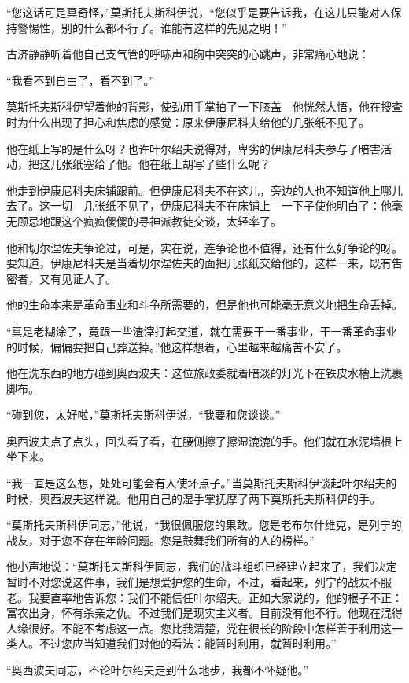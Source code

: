 “您这话可是真奇怪，”莫斯托夫斯科伊说，“您似乎是要告诉我，在这儿只能对人保持警惕性，别的什么都不行了。谁能有这样的先见之明！”

古济静静听着他自己支气管的呼哧声和胸中突突的心跳声，非常痛心地说：

“我看不到自由了，看不到了。”

莫斯托夫斯科伊望着他的背影，使劲用手掌拍了一下膝盖—他恍然大悟，他在搜查时为什么出现了担心和焦虑的感觉：原来伊康尼科夫给他的几张纸不见了。

他在纸上写的是什么呀？也许叶尔绍夫说得对，卑劣的伊康尼科夫参与了暗害活动，把这几张纸塞给了他。他在纸上胡写了些什么呢？

他走到伊康尼科夫床铺跟前。但伊康尼科夫不在这儿，旁边的人也不知道他上哪儿去了。这一切—几张纸不见了，伊康尼科夫不在床铺上—一下子使他明白了：他毫无顾忌地跟这个疯疯傻傻的寻神派教徒交谈，太轻率了。

他和切尔涅佐夫争论过，可是，实在说，连争论也不值得，还有什么好争论的呀。要知道，伊康尼科夫是当着切尔涅佐夫的面把几张纸交给他的，这样一来，既有吿密者，又有见证人了。

他的生命本来是革命事业和斗争所需要的，但是他也可能毫无意义地把生命丢掉。

“真是老糊涂了，竟跟一些渣滓打起交道，就在需要干一番事业，干一番革命事业的时候，偏偏要把自己葬送掉。”他这样想着，心里越来越痛苦不安了。

他在洗东西的地方碰到奥西波夫：这位旅政委就着暗淡的灯光下在铁皮水槽上洗裹脚布。

“碰到您，太好啦，”莫斯托夫斯科伊说，“我要和您谈谈。”

奥西波夫点了点头，回头看了看，在腰侧擦了擦湿漉漉的手。他们就在水泥墙根上坐下来。

“我一直是这么想，处处可能会有人使坏点子。”当莫斯托夫斯科伊谈起叶尔绍夫的时候，奥西波夫这样说。他用自己的湿手掌抚摩了两下莫斯托夫斯科伊的手。

“莫斯托夫斯科伊同志，”他说，“我很佩服您的果敢。您是老布尔什维克，是列宁的战友，对于您不存在年龄问题。您是鼓舞我们所有的人的榜样。”

他小声地说：“莫斯托夫斯科伊同志，我们的战斗组织已经建立起来了，我们决定暂时不对您说这件事，我们是想爱护您的生命，不过，看起来，列宁的战友不服老。我要直率地告诉您：我们不能信任叶尔绍夫。正如大家说的，他的根子不正：富农出身，怀有杀亲之仇。不过我们是现实主义者。目前没有他不行。他现在混得人缘很好。不能不考虑这一点。您比我清楚，党在很长的阶段中怎样善于利用这一类人。不过您应当知道我们对他的看法：能暂时利用，就暂时利用。”

“奥西波夫同志，不论叶尔绍夫走到什么地步，我都不怀疑他。”


